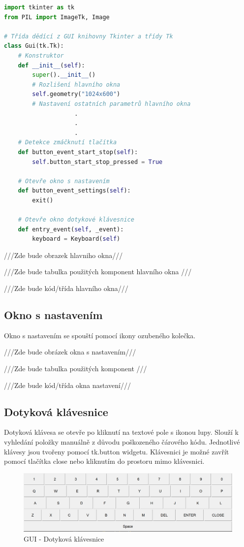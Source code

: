 \begin{lstlisting}[language=Python, caption=Hlavní okno, frame=single]
import tkinter as tk
from PIL import ImageTk, Image

# Třída dědící z GUI knihovny Tkinter a třídy Tk
class Gui(tk.Tk):
    # Konstruktor
    def __init__(self):
        super().__init__()
        # Rozlišení hlavního okna
        self.geometry("1024x600")
        # Nastavení ostatních parametrů hlavního okna
                    .
                    .
                    .
    # Detekce zmáčknutí tlačítka
    def button_event_start_stop(self):
        self.button_start_stop_pressed = True

    # Otevře okno s nastavením
    def button_event_settings(self):
        exit()

    # Otevře okno dotykové klávesnice
    def entry_event(self, _event):
        keyboard = Keyboard(self)


\end{lstlisting}

///Zde bude obrazek hlavniho okna///

///Zde bude tabulka použitých komponent hlavního okna ///

///Zde bude kód/třída hlavního okna///

\subsection{Okno s nastavením}

Okno s nastavením se spouští pomocí ikony ozubeného kolečka.

///Zde bude obrázek okna s nastavením///

///Zde bude tabulka použitých komponent ///

///Zde bude kód/třída okna nastavení///

\subsection{Dotyková klávesnice}

Dotyková klávesa se otevře po kliknutí na textové pole s ikonou lupy. Slouží k vyhledání položky manuálně z důvodu poškozeného čárového kódu. Jednotlivé klávesy jsou tvořeny pomocí tk.button widgetu. Klávesnici je možné zavřít pomocí tlačítka close nebo kliknutím do prostoru mimo klávesnici.

\begin{figure}[!h]
    \begin{center}
        \includegraphics[scale=0.45]{obrazky/klavesnice.PNG}
    \end{center}
    \caption{GUI - Dotyková klávesnice}
    \label{putty}
\end{figure}

